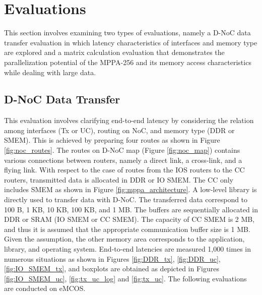 \documentclass[conference,compsoc]{IEEEtran}
\begin{document}

\section{Evaluations}
\label{sec:evaluations}
This section involves examining two types of evaluations, namely a D-NoC data transfer evaluation in which latency characteristics of interfaces and memory type are explored and a matrix calculation evaluation that demonstrates the parallelization potential of the MPPA-256 and its memory access characteristics while dealing with large data.

\subsection{D-NoC Data Transfer}
\label{sec:dnoc_eval}
This evaluation involves clarifying end-to-end latency by considering the relation among interfaces (Tx or UC), routing on NoC, and memory type (DDR or SMEM).
This is achieved by preparing four routes as shown in Figure \ref{fig:noc_routes}.
The routes on D-NoC map (Figure \ref{fig:noc_map}) contains various connections between routers, namely a direct link, a cross-link, and a flying link.
With respect to the case of routes from the IOS routers to the CC routers, transmitted data is allocated in DDR or IO SMEM.
The CC only includes SMEM as shown in Figure \ref{fig:mppa_architecture}.
A low-level library is directly used to transfer data with D-NoC.
The transferred data correspond to 100 B, 1 KB, 10 KB, 100 KB, and 1 MB.
The buffers are sequentially allocated in DDR or SRAM (IO SMEM or CC SMEM).
The capacity of CC SMEM is 2 MB, and thus it is assumed that the appropriate communication buffer size is 1 MB.
Given the assumption, the other memory area corresponds to the application, library, and operating system.
End-to-end latencies are measured 1,000 times in numerous situations as shown in Figures \ref{fig:DDR_tx}, \ref{fig:DDR_uc}, \ref{fig:IO_SMEM_tx}, and boxplots are obtained as depicted in Figures \ref{fig:IO_SMEM_uc}, \ref{fig:tx_uc_log} and \ref{fig:tx_uc}.
The following evaluations are conducted on eMCOS.
\end{document}
